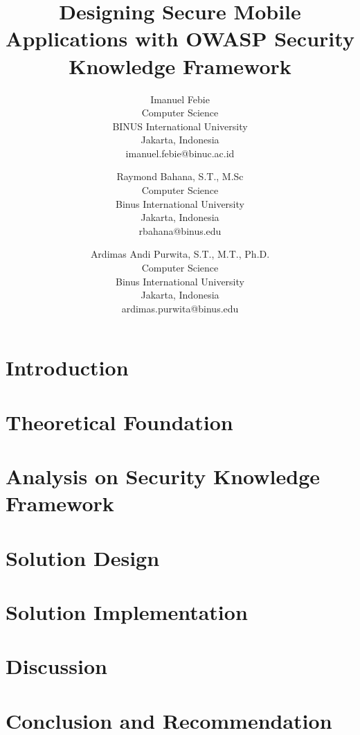 \documentclass[conference]{IEEEtran}
\title{Designing Secure Mobile Applications with OWASP Security Knowledge Framework}
\author{
    Imanuel Febie \\
    Computer Science \\
    BINUS International University \\
    Jakarta, Indonesia \\
    imanuel.febie@binuc.ac.id \\
    \and
    Raymond Bahana, S.T., M.Sc \\
    Computer Science \\
    Binus International University \\
    Jakarta, Indonesia \\
    rbahana@binus.edu \\
    \and
    Ardimas Andi Purwita, S.T., M.T., Ph.D. \\
    Computer Science \\
    Binus International University \\
    Jakarta, Indonesia \\
    ardimas.purwita@binus.edu\\
}
\begin{document}
\maketitle



\section{Introduction}


\section{Theoretical Foundation}


\section{Analysis on Security Knowledge Framework}


\section{Solution Design}


\section{Solution Implementation}


\section{Discussion}


\section{Conclusion and Recommendation}


\printbibliography
\end{document}
